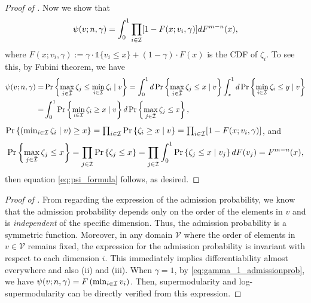 \begin{proof}[Proof of ]
Now we show that 
\begin{align}\label{eq:psi_formula}
\psi(v;n,\gamma)=
\int_0^1\prod_{i\in \mathcal{I}}[1-F(x;v_i,\gamma)] dF^{m-n}(x),
\end{align}
where $F(x;v_i,\gamma):=\gamma\cdot \mathds{1}\{v_i\leq x\} + (1-\gamma)\cdot F(x) $ is the CDF of $\zeta_i$. To see this, by Fubini theorem, we have 
\begin{align*}
    \psi(v;n,\gamma) =&  \Pr\left\{
\max_{j\in \Bar{\mathcal{I}}} \zeta_j \leq \min_{i\in \mathcal{I}}\zeta_i
\mid v\right\} 
=\int_0^1 d\Pr\left\{\max_{j\in \Bar{\mathcal{I}}} \zeta_j\leq x \mid v\right\} \int_x^1 d\Pr\left\{\min_{i\in \mathcal{I}}\zeta_i
\leq y \mid v\right\}\\
=&\int_0^1
\Pr\left\{\min_{i\in \mathcal{I}}\zeta_i
\geq x \mid v\right\}
d\Pr\left\{\max_{j\in \Bar{\mathcal{I}}} \zeta_j\leq x\right\},
\end{align*}
$\Pr\left\{\left(\min_{i\in \mathcal{I}}\zeta_i
\mid v\right) \geq x\right\} = \prod_{i\in \mathcal{I}}\Pr\left\{\zeta_i
 \geq x \mid v \right\}= \prod_{i\in \mathcal{I}}[1-F(x;v_i,\gamma)]$, and 
 \begin{align*}
\Pr\left\{\max_{j\in \Bar{\mathcal{I}}} \zeta_j\leq x\right\} = \prod_{j\in \Bar{\mathcal{I}}} \Pr\left\{\zeta_j\leq x\right\} =  \prod_{j\in \Bar{\mathcal{I}}} \int_0^1\Pr\left\{\zeta_j\leq x \mid v_j\right\}dF(v_j) = F^{m-n}(x),   
 \end{align*}
then equation \eqref{eq:psi_formula} follows, as desired.
\end{proof}

\begin{proof}[Proof of ]
From  regarding the expression of the admission probability, we know that the admission probability depends only on the order of the elements in $v$ and is \textit{independent} of the specific dimension. Thus, the admission probability is a symmetric function. Moreover, in any domain $\mathcal{V}$ where the order of elements in $v\in \mathcal{V}$ remains fixed, the expression for the admission probability is invariant with respect to each dimension $i$. This immediately implies differentiability almost everywhere and also  (ii) and (iii).
When $\gamma=1$, by \eqref{eq:gamma_1_admissionprob}, we have $\psi(v;n,\gamma)=F\left(\min_{i\in \mathcal{I}}v_i\right)$. Then, supermodularity and log-supermodularity can be directly verified from this expression. 
\end{proof}




